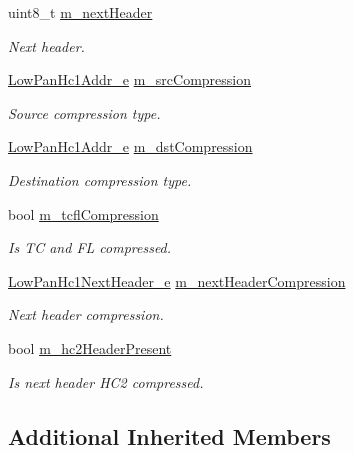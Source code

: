 \begin{DoxyCompactItemize}
uint8\+\_\+t \hyperlink{classns3_1_1SixLowPanHc1_aa08954a843538e01e384b603c8f4e974}{m\+\_\+next\+Header}
\begin{DoxyCompactList}\small\item\em Next header. \end{DoxyCompactList}\item 
\hyperlink{classns3_1_1SixLowPanHc1_a29c864d9bf6bc466ee2214a95a83dcad}{Low\+Pan\+Hc1\+Addr\+\_\+e} \hyperlink{classns3_1_1SixLowPanHc1_a9574bbdb0f66f5dcbb8e8da0268def4d}{m\+\_\+src\+Compression}
\begin{DoxyCompactList}\small\item\em Source compression type. \end{DoxyCompactList}\item 
\hyperlink{classns3_1_1SixLowPanHc1_a29c864d9bf6bc466ee2214a95a83dcad}{Low\+Pan\+Hc1\+Addr\+\_\+e} \hyperlink{classns3_1_1SixLowPanHc1_a638c930fee35815cfae763b091765bfb}{m\+\_\+dst\+Compression}
\begin{DoxyCompactList}\small\item\em Destination compression type. \end{DoxyCompactList}\item 
bool \hyperlink{classns3_1_1SixLowPanHc1_a4fe472128dbc9ea4a3c5aea72e391f03}{m\+\_\+tcfl\+Compression}
\begin{DoxyCompactList}\small\item\em Is TC and FL compressed. \end{DoxyCompactList}\item 
\hyperlink{classns3_1_1SixLowPanHc1_a685a2989be331260334b9ae653624cba}{Low\+Pan\+Hc1\+Next\+Header\+\_\+e} \hyperlink{classns3_1_1SixLowPanHc1_a4ada6621fa6474146b01612cc4532fc2}{m\+\_\+next\+Header\+Compression}
\begin{DoxyCompactList}\small\item\em Next header compression. \end{DoxyCompactList}\item 
bool \hyperlink{classns3_1_1SixLowPanHc1_a3f7d4c607559d9d32cf0003226561f49}{m\+\_\+hc2\+Header\+Present}
\begin{DoxyCompactList}\small\item\em Is next header H\+C2 compressed. \end{DoxyCompactList}\end{DoxyCompactItemize}
\subsection*{Additional Inherited Members}


